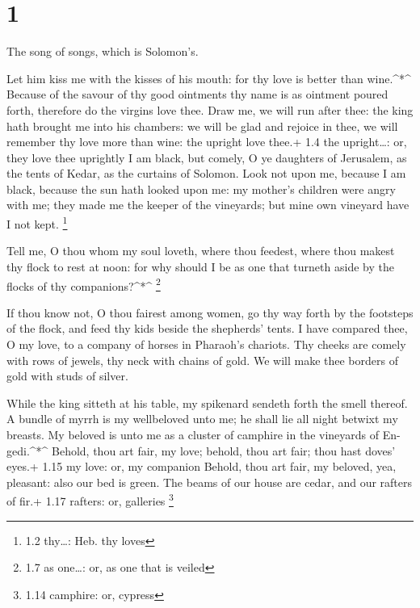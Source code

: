 \hypertarget{section}{%
\section{1}\label{section}}

 The song of songs, which is Solomon's.

 Let him kiss me with the kisses of his mouth: for thy love
is better than wine.\^{}*\^{}  Because of the savour of thy
good ointments thy name is as ointment poured forth, therefore do the
virgins love thee.  Draw me, we will run after thee: the
king hath brought me into his chambers: we will be glad and rejoice in
thee, we will remember thy love more than wine: the upright love thee.+
1.4 the upright\ldots: or, they love thee uprightly  I am
black, but comely, O ye daughters of Jerusalem, as the tents of Kedar,
as the curtains of Solomon.  Look not upon me, because I am
black, because the sun hath looked upon me: my mother's children were
angry with me; they made me the keeper of the vineyards; but mine own
vineyard have I not kept. \footnote{1.2 thy\ldots: Heb. thy loves}

 Tell me, O thou whom my soul loveth, where thou feedest,
where thou makest thy flock to rest at noon: for why should I be as one
that turneth aside by the flocks of thy companions?\^{}*\^{} \footnote{1.7
  as one\ldots: or, as one that is veiled}

 If thou know not, O thou fairest among women, go thy way
forth by the footsteps of the flock, and feed thy kids beside the
shepherds' tents.  I have compared thee, O my love, to a
company of horses in Pharaoh's chariots.  Thy cheeks are
comely with rows of jewels, thy neck with chains of gold. 
We will make thee borders of gold with studs of silver.

 While the king sitteth at his table, my spikenard sendeth
forth the smell thereof.  A bundle of myrrh is my
wellbeloved unto me; he shall lie all night betwixt my breasts.
 My beloved is unto me as a cluster of camphire in the
vineyards of En-gedi.\^{}*\^{}  Behold, thou art fair, my
love; behold, thou art fair; thou hast doves' eyes.+ 1.15 my love: or,
my companion  Behold, thou art fair, my beloved, yea,
pleasant: also our bed is green.  The beams of our house
are cedar, and our rafters of fir.+ 1.17 rafters: or, galleries
\footnote{1.14 camphire: or, cypress}

